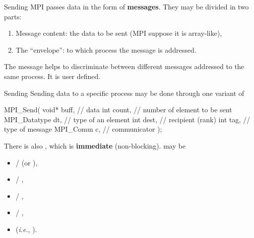 \begin{frame}{Sending}
	MPI passes data in the form of \textbf{messages}. They may be divided in two parts:\begin{enumerate}
		\item Message content: the data to be sent (MPI suppose it is array-like),
		\item The ``envelope'': to which process the message is addressed.
	\end{enumerate}
\begin{center}
\end{center}
The message  helps to discriminate between different messages addressed to the same process. It is user defined.
\end{frame}

\begin{frame}[fragile]{Sending}
	Sending data to a specific process may be done through one variant of
	\begin{ccode}
MPI_Send(
	void* buff,      // data
	int count,       // number of element to be sent
	MPI_Datatype dt, // type of an element
	int dest,        // recipient (rank)
	int tag,         // type of message
	MPI_Comm c,      // communicator
);
	\end{ccode}
There is also , which is \textbf{immediate} (non-blocking).  may be\begin{itemize}
	\item {} /  (or ),
	\item {} / ,
	\item {} / ,
	\item {} / ,
	\item {} (\textit{i.e.}, ).
\end{itemize}
\end{frame}

